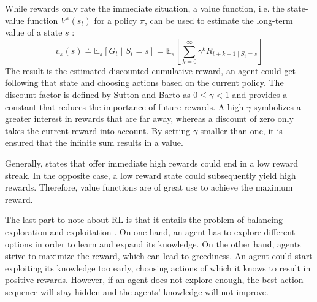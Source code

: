 While rewards only rate the immediate situation, a value function, i.e. the state-value function $V^\pi(s_t)$ for a policy $\pi$, can be used to estimate the long-term value of a state $s$ \cite{suba18}:
\begin{equation}\label{eq:value_func}
    v_\pi(s) \doteq \mathbb{E}_\pi \left[ G_t \mid S_t = s \right] = \mathbb{E}_\pi \left[ \sum^{\infty}_{k=0} \gamma^k R_{t+k+1 \mid S_t = s}  \right]
\end{equation}
The result is the estimated discounted cumulative reward, an agent could get following that state and choosing actions based on the current policy. The discount factor is defined by Sutton and Barto as $0 \le \gamma < 1$ and provides a constant that reduces the importance of future rewards. A high $\gamma$ symbolizes a greater interest in rewards that are far away, whereas a discount of zero only takes the current reward into account. By setting $\gamma$ smaller than one, it is ensured that the infinite sum results in a value.

Generally, states that offer immediate high rewards could end in a 
low reward streak. In the opposite case, a low reward state could subsequently yield high rewards. Therefore, value functions are of great use to achieve the maximum reward.

The last part to note about RL is that it entails the problem of balancing exploration and exploitation \cite{suba18}. On one hand, an agent has to explore different options in order to learn and expand its knowledge. On the other hand, agents strive to maximize the reward, which can lead to greediness. An agent could start exploiting its knowledge too early, choosing actions of which it knows to result in positive rewards. However, if an agent does not explore enough, the best action sequence will stay hidden and the agents' knowledge will not improve.


